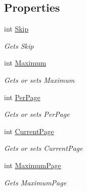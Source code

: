 \subsection*{Properties}
\begin{DoxyCompactItemize}
\item 
int \mbox{\hyperlink{class_gtd_app_1_1_repository_1_1_paginator_a73cc899e1e4213c0db38eb05df585d9d}{Skip}}
\begin{DoxyCompactList}\small\item\em Gets Skip \end{DoxyCompactList}\item 
int \mbox{\hyperlink{class_gtd_app_1_1_repository_1_1_paginator_ae6d13f020cf12142c840680854977c82}{Maximum}}
\begin{DoxyCompactList}\small\item\em Gets or sets Maximum \end{DoxyCompactList}\item 
int \mbox{\hyperlink{class_gtd_app_1_1_repository_1_1_paginator_a47b791460f8dedb296d18d2211a329fd}{Per\+Page}}
\begin{DoxyCompactList}\small\item\em Gets or sets Per\+Page \end{DoxyCompactList}\item 
int \mbox{\hyperlink{class_gtd_app_1_1_repository_1_1_paginator_a359ad329137139ac6cac0538bcb4ec97}{Current\+Page}}
\begin{DoxyCompactList}\small\item\em Gets or sets Current\+Page \end{DoxyCompactList}\item 
int \mbox{\hyperlink{class_gtd_app_1_1_repository_1_1_paginator_ae25073eb95f1a18b74c188adb5d43617}{Maximum\+Page}}
\begin{DoxyCompactList}\small\item\em Gets Maximum\+Page \end{DoxyCompactList}\end{DoxyCompactItemize}
